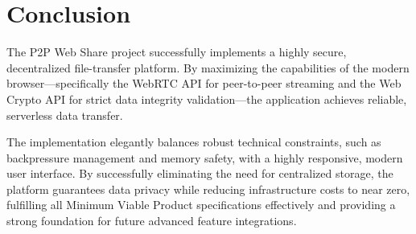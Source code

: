\documentclass[12pt, a4paper]{article}
\begin{document}
\section{Conclusion}
The P2P Web Share project successfully implements a highly secure, decentralized file-transfer platform. By maximizing the capabilities of the modern browser---specifically the WebRTC API for peer-to-peer streaming and the Web Crypto API for strict data integrity validation---the application achieves reliable, serverless data transfer. 

The implementation elegantly balances robust technical constraints, such as backpressure management and memory safety, with a highly responsive, modern user interface. By successfully eliminating the need for centralized storage, the platform guarantees data privacy while reducing infrastructure costs to near zero, fulfilling all Minimum Viable Product specifications effectively and providing a strong foundation for future advanced feature integrations.
\end{document}
